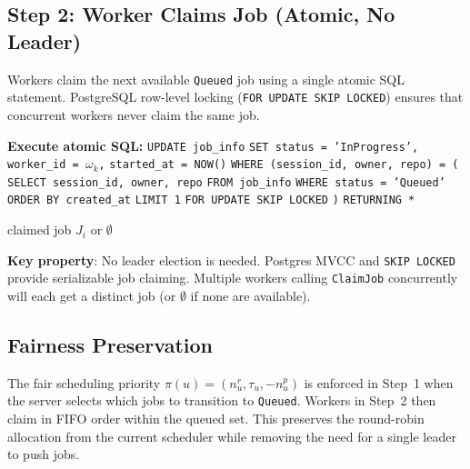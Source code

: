 \documentclass[11pt]{article}
\begin{document}
\subsection{Step 2: Worker Claims Job (Atomic, No Leader)}

Workers claim the next available \texttt{Queued} job using a single atomic SQL
statement. PostgreSQL row-level locking (\texttt{FOR UPDATE SKIP LOCKED}) ensures
that concurrent workers never claim the same job.

\begin{algorithm}[H]
\caption{Atomic Job Claim (Worker-Side)}
\begin{algorithmic}[1]

  \State \textbf{Execute atomic SQL:}
  \State \quad \texttt{UPDATE job\_info}
  \State \quad \texttt{SET status = 'InProgress',}
  \State \quad \quad \texttt{worker\_id = }$\omega_k$\texttt{,}
  \State \quad \quad \texttt{started\_at = NOW()}
  \State \quad \texttt{WHERE (session\_id, owner, repo) = (}
  \State \quad \quad \texttt{SELECT session\_id, owner, repo}
  \State \quad \quad \texttt{FROM job\_info}
  \State \quad \quad \texttt{WHERE status = 'Queued'}
  \State \quad \quad \texttt{ORDER BY created\_at}
  \State \quad \quad \texttt{LIMIT 1}
  \State \quad \quad \texttt{FOR UPDATE SKIP LOCKED}
  \State \quad \texttt{)}
  \State \quad \texttt{RETURNING *}

  \State \Return claimed job $J_i$ or $\emptyset$

\EndProcedure
\end{algorithmic}
\end{algorithm}

\textbf{Key property}: No leader election is needed. Postgres MVCC and
\texttt{SKIP LOCKED} provide serializable job claiming. Multiple workers calling
\texttt{ClaimJob} concurrently will each get a distinct job (or $\emptyset$ if none
are available).

\subsection{Fairness Preservation}

The fair scheduling priority $\pi(u) = (n_u^r, \tau_u, -n_u^p)$ is enforced in
Step~1 when the server selects which jobs to transition to \texttt{Queued}. Workers
in Step~2 then claim in FIFO order within the queued set. This preserves the
round-robin allocation from the current scheduler while removing the need for a
single leader to push jobs.
\end{document}
